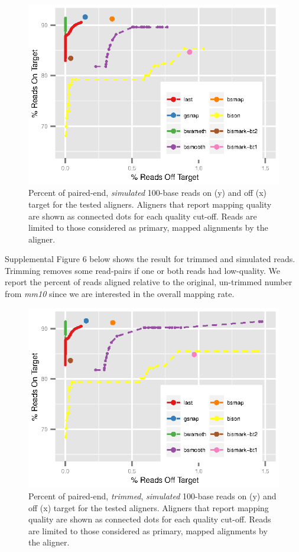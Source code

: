 \documentclass[12pt]{article}
\begin{document}
\begin{figure}[H]%
    \centerline{\includegraphics[width=125mm]{noerrorsim-quals.eps}}
    \caption{Percent of paired-end, \emph{simulated} 100-base reads on (y) and off (x)
    target for the tested aligners. Aligners that report mapping quality are shown as
    connected dots for each quality cut-off. Reads are limited to those considered as
    primary, mapped alignments by the aligner.
}\label{suppfig:05}
\end{figure}

Supplemental Figure 6 below shows the result for trimmed and simulated reads.
Trimming removes some read-pairs if one or both reads had low-quality. We
report the percent of reads aligned relative to the original, 
un-trimmed number from \emph{mm10} since we are interested in the overall
mapping rate. 
 
\begin{figure}[H]%
    \centerline{\includegraphics[width=125mm]{noerrorsim-trim-quals.eps}}
    \caption{Percent of paired-end, \emph{trimmed}, \emph{simulated} 100-base reads on (y) and off (x) target for the tested aligners. Aligners that report mapping quality are shown as connected dots for each quality cut-off. Reads are limited to those considered as primary, mapped alignments by the aligner.
}\label{suppfig:06}
\end{figure}
\end{document}
